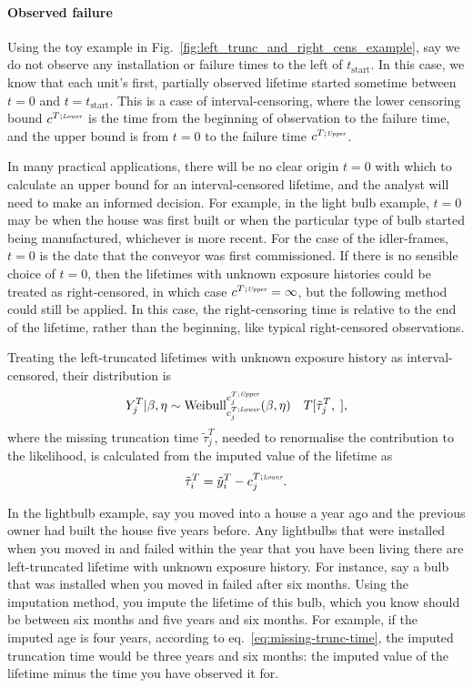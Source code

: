 \paragraph*{Observed failure}
Using the toy example in Fig.~\ref{fig:left_trunc_and_right_cens_example}, say we do not observe any installation or failure times to the left of $t_\text{start}$. In this case, we know that each unit's first, partially observed lifetime started sometime between $t = 0$ and $t = t_\text{start}$. This is a case of interval-censoring, where the lower censoring bound $c^{T;\textit{\tiny{Lower}}}$ is the time from the beginning of observation to the failure time, and the upper bound is from $t = 0$ to the failure time $c^{T;\textit{\tiny{Upper}}}$.

In many practical applications, there will be no clear origin $t = 0$ with which to calculate an upper bound for an interval-censored lifetime, and the analyst will need to make an informed decision. For example, in the light bulb example, $t = 0$ may be when the house was first built or when the particular type of bulb started being manufactured, whichever is more recent. For the case of the idler-frames, $t = 0$ is the date that the conveyor was first commissioned. If there is no sensible choice of $t = 0$, then the lifetimes with unknown exposure histories could be treated as right-censored, in which case $c^{T;\textit{\tiny{Upper}}} = \infty$, but the following method could still be applied. In this case, the right-censoring time is relative to the end of the lifetime, rather than the beginning, like typical right-censored observations.

Treating the left-truncated lifetimes with unknown exposure history as interval-censored, their distribution is
\begin{equation}
    Y^T_j|\beta, \eta \sim \hbox{Weibull}^{c^{T;\textit{\tiny{Upper}}}_{j}}_{c^{T;\textit{\tiny{Lower}}}_{j}}(\beta, \eta) \quad T[\tilde{\tau}^{T}_j, \;],
\end{equation}
where the missing truncation time $\tilde{\tau}^{T}_j$, needed to renormalise the contribution to the likelihood, is calculated from the imputed value of the lifetime as
\begin{equation}
    \label{eq:missing-trunc-time}
   \tilde{\tau}^T_i = \tilde{y}^T_i - c^{T;\textit{\tiny{Lower}}}_{j}.
\end{equation}

In the lightbulb example, say you moved into a house a year ago and the previous owner had built the house five years before. Any lightbulbs that were installed when you moved in and failed within the year that you have been living there are left-truncated lifetime with unknown exposure history. For instance, say a bulb that was installed when you moved in failed after six months. Using the imputation method, you impute the lifetime of this bulb, which you know should be between six months and five years and six months. For example, if the imputed age is four years, according to eq.~\eqref{eq:missing-trunc-time}, the imputed truncation time would be three years and six months: the imputed value of the lifetime minus the time you have observed it for.

